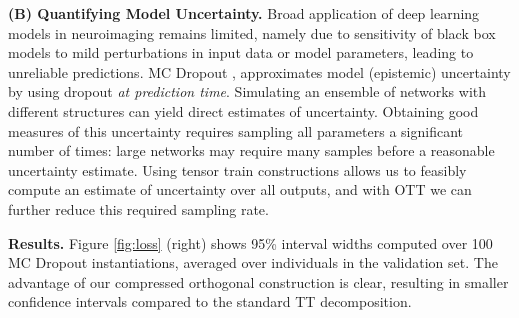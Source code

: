 \textbf{(B) Quantifying Model Uncertainty.}
Broad application of deep learning models in neuroimaging remains limited, namely due to sensitivity of black box models to mild perturbations in input data or model parameters, leading to unreliable predictions.
MC Dropout \cite{gal2016dropout}, approximates model (epistemic) uncertainty by using dropout \textit{at prediction time}. Simulating an ensemble of networks with different structures can yield direct estimates of uncertainty.
Obtaining good measures of this uncertainty requires sampling all parameters a significant number of times: large networks may require many samples before a reasonable uncertainty estimate.
Using tensor train constructions allows us to feasibly compute an estimate of uncertainty over all outputs, and with OTT we can further reduce this required sampling rate.

\textbf{Results.} Figure \ref{fig:loss} (right)
shows
95\% interval widths computed over 100 MC Dropout instantiations, averaged over individuals in the validation set. The advantage of our compressed orthogonal construction is clear, resulting in smaller confidence intervals compared to the standard TT decomposition. 




